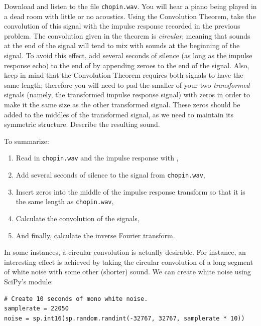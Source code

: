 \begin{problem}
Download and listen to the file \texttt{chopin.wav}.
You will hear a piano being played in a dead room with little or no acoustics.
Using the Convolution Theorem, take the convolution of this signal with the impulse response recorded in the previous problem.
The convolution given in the theorem is \emph{circular}, meaning that sounds at the end of the signal will tend to mix with sounds at the beginning of the signal.
To avoid this effect, add several seconds of silence (as long as the impulse response echo) to the end of  by appending zeroes to the end of the signal.
Also, keep in mind that the Convolution Theorem requires both signals to have the same length; therefore you will need to pad the smaller of your two \emph{transformed} signals (namely, the transformed impulse response signal) with zeros in order to make it the same size as the other transformed signal.
These zeros should be added to the middles of the transformed signal, as we need to maintain its symmetric structure.
Describe the resulting sound.

To summarize:
\begin{enumerate}
\item Read in \texttt{chopin.wav} and the impulse response with ,
\item Add several seconds of silence to the signal from \texttt{chopin.wav},
\item Insert zeros into the middle of the impulse response transform so that it is the same length as  \texttt{chopin.wav},
\item Calculate the convolution of the signals,
\item And finally, calculate the inverse Fourier transform.
\end{enumerate}

\end{problem}

In some instances, a circular convolution is actually desirable.
For instance, an interesting effect is achieved by taking the circular convolution of a long segment of white noise with some other (shorter) sound.
We can create white noise using SciPy's  module:
\begin{lstlisting}
# Create 10 seconds of mono white noise.
samplerate = 22050
noise = sp.int16(sp.random.randint(-32767, 32767, samplerate * 10))
\end{lstlisting}

